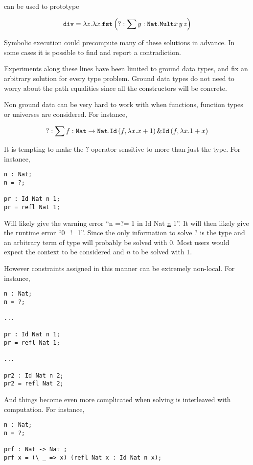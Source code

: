 can be used to prototype

\[
\mathtt{div}=\lambda z.\lambda x.\mathtt{fst}\left(?:\sum y:\mathtt{Nat}{}.\mathtt{Mult}x\,y\,z\right)
\]

Symbolic execution could precompute many of these solutions in advance.
In some cases it is possible to find and report a contradiction. 

Experiments along these lines have been limited to ground data types, and fix an arbitrary solution for every type problem.
Ground data types do not need to worry about the path equalities since all the constructors will be concrete.

Non ground data can be very hard to work with when functions, function types or universes are considered.
For instance,

\[
?:\sum f:\mathtt{Nat}{}\rightarrow\mathtt{Nat}{}.\mathtt{Id}\left(f,\lambda x.x+1\right)\&\mathtt{Id}\left(f,\lambda x.1+x\right)
\]

It is tempting to make the $?$ operator sensitive to more than just the type.
For instance,

\begin{lstlisting}
n : Nat;
n = ?;

pr : Id Nat n 1;
pr = refl Nat 1;
\end{lstlisting}

Will likely give the warning error ``n =?= 1 in Id Nat \uline{n} 1''.
It will then likely give the runtime error ``0=!=1''.
Since the only information to solve $\mathtt{?}$ is the type \Nat{} and an arbitrary term of type \Nat{} will probably be solved with 0.
Most users would expect the context to be considered and $n$ to be solved with $1$.

However constraints assigned in this manner can be extremely non-local.
For instance,

\begin{lstlisting}
n : Nat;
n = ?;

...

pr : Id Nat n 1;
pr = refl Nat 1;

...

pr2 : Id Nat n 2;
pr2 = refl Nat 2;
\end{lstlisting}

And things become even more complicated when solving is interleaved with computation.
For instance,

\begin{lstlisting}
n : Nat;
n = ?;

prf : Nat -> Nat ;
prf x = (\ _ => x) (refl Nat x : Id Nat n x);
\end{lstlisting}


